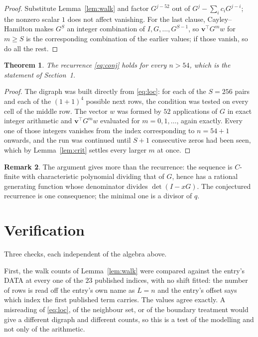 \documentclass[11pt,a4paper]{article}
\theoremstyle{plain}
\newtheorem{theorem}{Theorem}
\theoremstyle{definition}
\newtheorem{remark}[theorem]{Remark}
\begin{document}
\begin{proof}
Substitute Lemma~\ref{lem:walk} and factor $G^{j-52}$ out of
$G^{j}-\sum_ic_iG^{j-i}$; the nonzero scalar $1$ does not affect
vanishing. For the last clause, Cayley--Hamilton makes $G^{S}$ an integer combination of
$I,G,\dots,G^{S-1}$, so $\mathbf{v}^{\!\top}G^{m}w$ for $m\ge S$ is the corresponding
combination of the earlier values; if those vanish, so do all the rest.
\end{proof}

\begin{theorem}
The recurrence \eqref{eq:conj} holds for every $n>54$, which is the statement of
Section~1.
\end{theorem}

\begin{proof}
The digraph was built directly from \eqref{eq:loc}: for each of the $S=256$ pairs and each
of the $(1+1)^{4}$ possible next rows, the condition was tested on every cell of
the middle row. The vector $w$ was formed by $52$ applications of $G$ in exact integer
arithmetic and $\mathbf{v}^{\!\top}G^{m}w$ evaluated for $m=0,1,\dots$, again exactly.
Every one of those integers vanishes from the index corresponding to $n=54+1$ onwards,
and the run was continued until $S+1$ consecutive zeros had been seen, which by
Lemma~\ref{lem:crit} settles every larger $m$ at once.
\end{proof}

\begin{remark}
The argument gives more than the recurrence: the sequence is $C$-finite with characteristic
polynomial dividing that of $G$, hence has a rational generating function whose denominator
divides $\det(I-xG)$. The conjectured recurrence is one consequence; the minimal one is a
divisor of $q$.
\end{remark}

\section{Verification}

Three checks, each independent of the algebra above.

First, the walk counts of Lemma~\ref{lem:walk} were compared against the entry's DATA at
every one of the $23$ published indices, with no shift fitted: the number of rows is
read off the entry's own name as $L=n$ and the entry's offset says which index the first
published term carries. The values agree exactly. A misreading of \eqref{eq:loc}, of the
neighbour set, or of the boundary treatment would give a different digraph and different
counts, so this is a test of the modelling and not only of the arithmetic.
\end{document}
